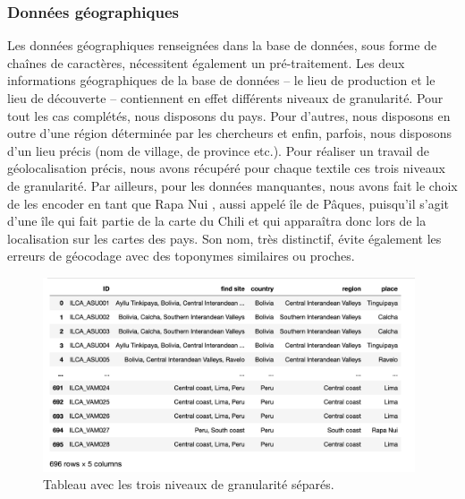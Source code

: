 \subsubsection{Données géographiques}

Les données géographiques renseignées dans la base de données, sous forme de chaînes de caractères, nécessitent également un pré-traitement. Les deux informations géographiques de la base de données -- le lieu de production et le lieu de découverte -- contiennent en effet différents niveaux de granularité. Pour tout les cas complétés, nous disposons du pays. Pour d'autres, nous disposons en outre d'une région déterminée par les chercheurs et enfin, parfois, nous disposons d'un lieu précis (nom de village, de province etc.). Pour réaliser un travail de géolocalisation précis, nous avons récupéré pour chaque textile ces trois niveaux de granularité. Par ailleurs, pour les données manquantes, nous avons fait le choix de les encoder en tant que \og Rapa Nui \fg, aussi appelé île de Pâques, puisqu'il s'agit d'une île qui fait partie de la carte du Chili et qui apparaîtra donc lors de la localisation sur les cartes des pays. Son nom, très distinctif, évite également les erreurs de géocodage avec des toponymes similaires ou proches.

  \begin{figure}[!h]
	\begin{center}
		\includegraphics[width=11cm]{../images/geo_df_find.png}
           	 \caption{Tableau avec les trois niveaux de granularité séparés.}
           	 \label{fig:geo_df_find}
	 \end{center}
  \end{figure}
  

